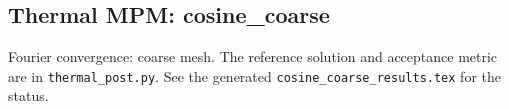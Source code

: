 \subsection{Thermal MPM: cosine\_coarse}
Fourier convergence: coarse mesh. The reference solution and acceptance metric are in \texttt{thermal\_post.py}. See the generated \texttt{cosine\_coarse\_results.tex} for the status.
